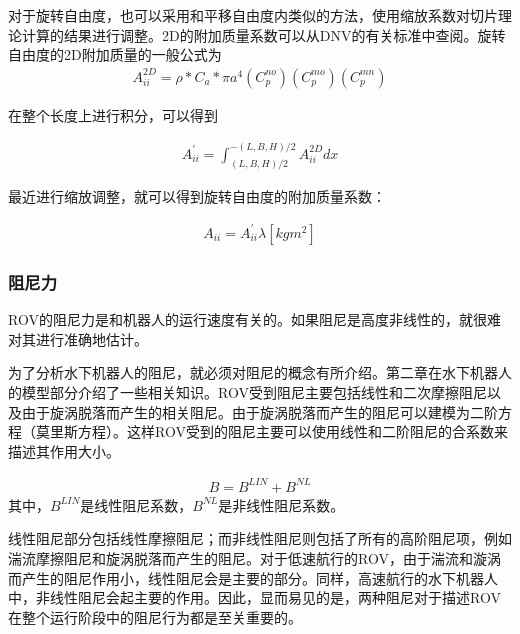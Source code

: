对于旋转自由度，也可以采用和平移自由度内类似的方法，使用缩放系数对切片理论计算的结果进行调整。2D的附加质量系数可以从DNV的有关标准中查阅。旋转自由度的2D附加质量的一般公式为
\begin{equation}
\begin{aligned}
A_{ii}^{2D} = \rho \ast C_a \ast \pi a^4 (C_p^{no})(C_p^{mo})(C_p^{mn})
\end{aligned}
\end{equation}

在整个长度上进行积分，可以得到

\begin{equation}
\begin{aligned}
A_{ii}^{'} = \int_{(L,B,H)/2}^{-(L,B,H)/2}A_{ii}^{2D}dx
\end{aligned}
\end{equation}

最近进行缩放调整，就可以得到旋转自由度的附加质量系数：

\begin{equation}
\begin{aligned}
A_{ii} = A_{ii}^{'} \lambda [kgm^{2}]
\end{aligned}
\end{equation}

\subsubsection{阻尼力}

ROV的阻尼力是和机器人的运行速度有关的。如果阻尼是高度非线性的，就很难对其进行准确地估计。

为了分析水下机器人的阻尼，就必须对阻尼的概念有所介绍。第二章在水下机器人的模型部分介绍了一些相关知识。ROV受到阻尼主要包括线性和二次摩擦阻尼以及由于旋涡脱落而产生的相关阻尼。由于旋涡脱落而产生的阻尼可以建模为二阶方程（莫里斯方程）。这样ROV受到的阻尼主要可以使用线性和二阶阻尼的合系数来描述其作用大小。

\begin{equation}
\begin{aligned}
B = B ^{LIN} + B ^{NL}
\end{aligned}
\end{equation}
其中，$B ^{LIN}$是线性阻尼系数，$B ^{NL}$是非线性阻尼系数。

线性阻尼部分包括线性摩擦阻尼；而非线性阻尼则包括了所有的高阶阻尼项，例如湍流摩擦阻尼和旋涡脱落而产生的阻尼。对于低速航行的ROV，由于湍流和漩涡而产生的阻尼作用小，线性阻尼会是主要的部分。同样，高速航行的水下机器人中，非线性阻尼会起主要的作用。因此，显而易见的是，两种阻尼对于描述ROV在整个运行阶段中的阻尼行为都是至关重要的。

